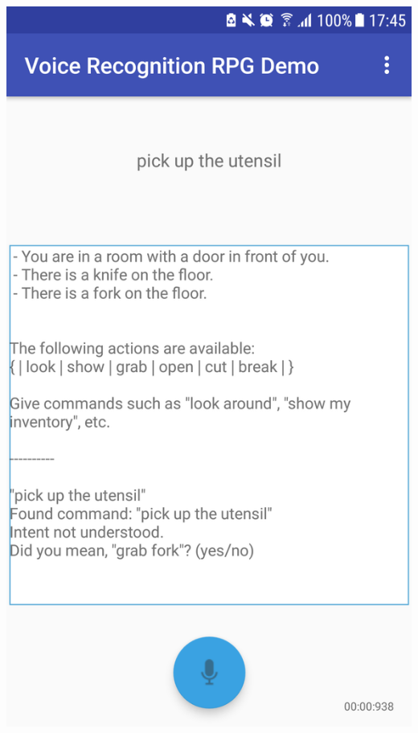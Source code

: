 \documentclass[11pt]{article}
\begin{document}
\begin{center}
\includegraphics[scale=0.18]{utensil-1.png}

\end{center}
\end{document}
